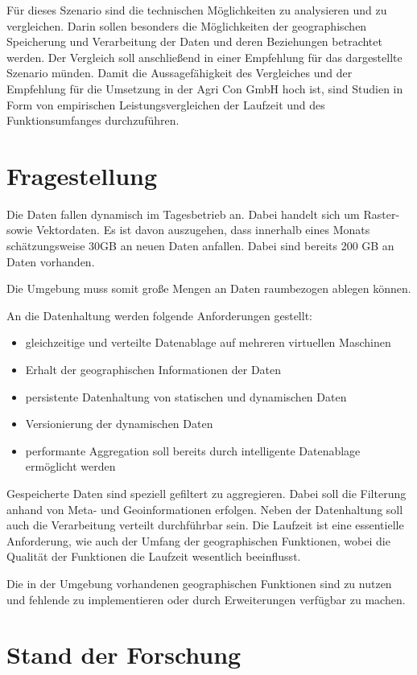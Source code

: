 \documentclass[
a4paper,     %
12pt         %
]{scrartcl}  %
\begin{document}
Für dieses Szenario sind die technischen Möglichkeiten zu analysieren und zu vergleichen.
Darin sollen besonders die Möglichkeiten der geographischen Speicherung und Verarbeitung der Daten und deren Beziehungen betrachtet werden.
Der Vergleich soll anschließend in einer Empfehlung für das dargestellte Szenario münden.
Damit die Aussagefähigkeit des Vergleiches und der Empfehlung für die Umsetzung in der Agri Con GmbH hoch ist, sind Studien in Form von empirischen Leistungsvergleichen der Laufzeit und des Funktionsumfanges durchzuführen.

\section{Fragestellung}

Die Daten fallen dynamisch im Tagesbetrieb an.
Dabei handelt sich um Raster- sowie Vektordaten.
Es ist davon auszugehen, dass innerhalb eines Monats schätzungsweise 30GB an neuen Daten anfallen.
Dabei sind bereits 200 GB an Daten vorhanden.

Die Umgebung muss somit große Mengen an Daten raumbezogen ablegen können.

An die Datenhaltung werden folgende Anforderungen gestellt:
\begin{itemize}
\item gleichzeitige und verteilte Datenablage auf mehreren virtuellen Maschinen
\item Erhalt der geographischen Informationen der Daten
\item persistente Datenhaltung von statischen und dynamischen Daten
\item Versionierung der dynamischen Daten
\item performante Aggregation soll bereits durch intelligente Datenablage ermöglicht werden
\end{itemize}

Gespeicherte Daten sind speziell gefiltert zu aggregieren.
Dabei soll die Filterung anhand von Meta- und Geoinformationen erfolgen.
Neben der Datenhaltung soll auch die Verarbeitung verteilt durchführbar sein.
Die Laufzeit ist eine essentielle Anforderung, wie auch der Umfang der geographischen Funktionen, wobei die Qualität der Funktionen die Laufzeit wesentlich beeinflusst.

Die in der Umgebung vorhandenen geographischen Funktionen sind zu nutzen und fehlende zu implementieren oder durch Erweiterungen verfügbar zu machen.

\section{Stand der Forschung}
\end{document}

